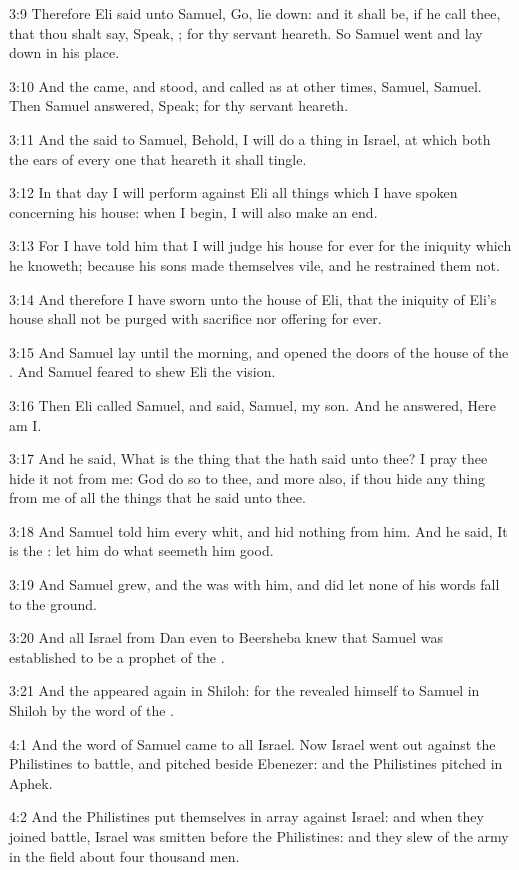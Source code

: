 3:9 Therefore Eli said unto Samuel, Go, lie down: and it shall be, if he call thee, that thou shalt say, Speak, \LORD; for thy servant heareth. So Samuel went and lay down in his place.

3:10 And the \LORD came, and stood, and called as at other times, Samuel, Samuel. Then Samuel answered, Speak; for thy servant heareth.

3:11 And the \LORD said to Samuel, Behold, I will do a thing in Israel, at which both the ears of every one that heareth it shall tingle.

3:12 In that day I will perform against Eli all things which I have spoken concerning his house: when I begin, I will also make an end.

3:13 For I have told him that I will judge his house for ever for the iniquity which he knoweth; because his sons made themselves vile, and he restrained them not.

3:14 And therefore I have sworn unto the house of Eli, that the iniquity of Eli's house shall not be purged with sacrifice nor offering for ever.

3:15 And Samuel lay until the morning, and opened the doors of the house of the \LORD. And Samuel feared to shew Eli the vision.

3:16 Then Eli called Samuel, and said, Samuel, my son. And he answered, Here am I.

3:17 And he said, What is the thing that the \LORD hath said unto thee?  I pray thee hide it not from me: God do so to thee, and more also, if thou hide any thing from me of all the things that he said unto thee.

3:18 And Samuel told him every whit, and hid nothing from him. And he said, It is the \LORD: let him do what seemeth him good.

3:19 And Samuel grew, and the \LORD was with him, and did let none of his words fall to the ground.

3:20 And all Israel from Dan even to Beersheba knew that Samuel was established to be a prophet of the \LORD.

3:21 And the \LORD appeared again in Shiloh: for the \LORD revealed himself to Samuel in Shiloh by the word of the \LORD.

4:1 And the word of Samuel came to all Israel. Now Israel went out against the Philistines to battle, and pitched beside Ebenezer: and the Philistines pitched in Aphek.

4:2 And the Philistines put themselves in array against Israel: and when they joined battle, Israel was smitten before the Philistines: and they slew of the army in the field about four thousand men.

